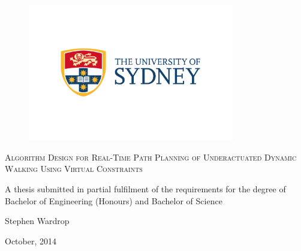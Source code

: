\thispagestyle{empty}
\begin{titlepage}
\setcounter{page}{1}
\begin{center}

\begin{figure}[H]
\centering
\includegraphics[width = 0.8\textwidth]{Images/usyd.jpg}
\end{figure}

\doublespacing
\textsc{ \LARGE Algorithm Design for Real-Time Path Planning of Underactuated Dynamic Walking Using Virtual Constraints}

\vspace{2cm}

\singlespacing
A thesis submitted in partial fulfilment of the requirements for the degree of \\ Bachelor of Engineering (Honours) and Bachelor of Science

\vspace{2cm}

\large
Stephen Wardrop

\vfill

October, 2014

\end{center}
\end{titlepage}
\pagebreak

